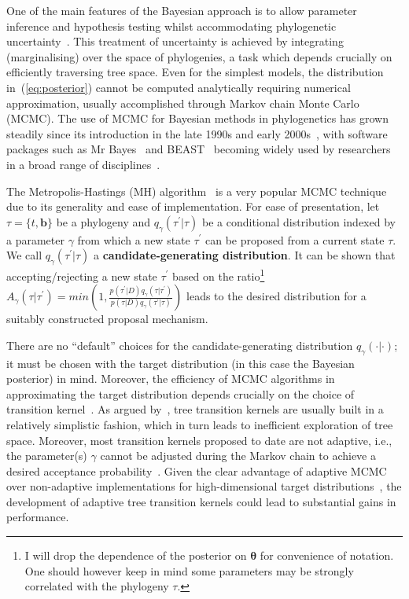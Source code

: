One of the main features of the Bayesian  approach is to allow parameter inference and hypothesis testing whilst accommodating phylogenetic uncertainty~\citep{Suchard2001, Huelsenbeck2002, Lemey2014, Cybis2015, Baele2015, Baele2017}.
This treatment of uncertainty is achieved by integrating (marginalising) over the space of phylogenies, a task which depends crucially on efficiently traversing tree space.
Even for the simplest models, the distribution in~(\ref{eq:posterior}) cannot be computed analytically requiring numerical approximation, usually accomplished through Markov chain Monte Carlo (MCMC).
The use of MCMC for Bayesian methods in phylogenetics has grown steadily since its introduction in the late 1990s and early 2000s~\citep{Kuhner1995,Sinsheimer1996, Rannala1996, Yang1997, Mau1999, Li2000, Suchard2001,Drummond2002}, with software packages such as Mr Bayes~\citep{Ronquist2012} and BEAST~\citep{Drummond2012,Suchard2018} becoming widely used by researchers in a broad range of disciplines~\citep{Murphy2001, Bouckaert2012, Lemey2014}.

The Metropolis-Hastings (MH) algorithm~\citep{Metropolis1953, Hastings1970} is a very popular MCMC technique due to its generality and ease of implementation.
For ease of presentation, let $\tau = \{ t, \boldsymbol b\}$ be a phylogeny and $q_{\gamma}(\tau^\prime|\tau)$ be a conditional distribution indexed by a parameter $\gamma$ from which a new state $\tau^\prime$ can be proposed from a current state $\tau$.
We call $q_{\gamma}(\tau^\prime|\tau)$ a \textbf{candidate-generating distribution}.
It can be shown that accepting/rejecting a new state $\tau^\prime$ based on the ratio\footnote{I will drop the dependence of the posterior on $\boldsymbol\theta$ for convenience of notation. One should however keep in mind some parameters may be strongly correlated with the phylogeny $\tau$.} $A_{\gamma}(\tau | \tau^\prime) = min\left(1, \frac{p(\tau^\prime | D)q_{\gamma}(\tau|\tau^\prime)}{p(\tau | D)q_{\gamma}(\tau^\prime|\tau)}\right)$ leads to the desired distribution for a suitably constructed proposal mechanism.

There are no ``default'' choices for the candidate-generating distribution $q_{\gamma}(\cdot|\cdot)$; it must be chosen with the target distribution (in this case the Bayesian posterior) in mind.
Moreover, the efficiency of MCMC algorithms in approximating the target distribution depends crucially on the choice of transition kernel~\citep{Brooks2003,AlAwadhi2004,Yang2013,Thawornwattana2017}.
As argued by~\cite{Hoehna2012}, tree transition kernels are usually built in a relatively simplistic fashion, which in turn leads to inefficient exploration of tree space.
Moreover, most transition kernels proposed to date are not adaptive, i.e., the parameter(s) $\gamma$ cannot be adjusted during the Markov chain to achieve a desired acceptance probability~\citep{Haario2001}.
Given the clear advantage of adaptive MCMC over non-adaptive implementations for high-dimensional target distributions~\citep{Roberts2009, Baele2017}, the development of adaptive tree transition kernels could lead to substantial gains in performance.

